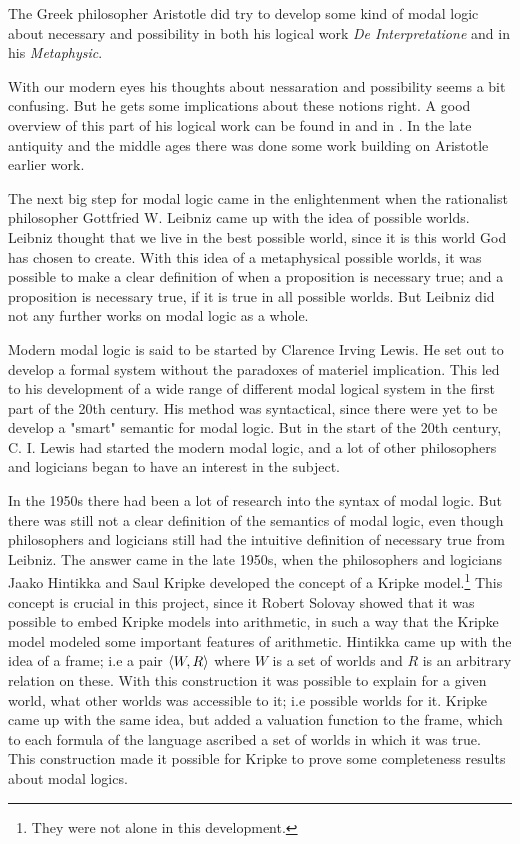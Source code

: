 \documentclass[../main.tex]{subfiles}
\begin{document}
The Greek philosopher Aristotle did try to develop some kind of modal logic
about necessary and possibility in both his logical work \textit{De
Interpretatione} and in his
 \textit{Metaphysic}.

With our modern eyes his thoughts about nessaration and possibility seems a
bit confusing. But he gets some implications about these notions right. A good
overview of this part of his logical work can be found in \parencite{Lemmon1977} and
in \parencite{Luka1957}.
In the late antiquity and the middle ages there was done some work building on 
Aristotle earlier work. 

The next big step for modal logic came in the enlightenment when the
rationalist philosopher Gottfried W. Leibniz came up with the idea of possible
worlds.  Leibniz thought that we live in the best possible world, since it is
this world God has chosen to create. With this idea of a metaphysical possible
worlds, it was possible to make a clear definition of when a proposition is
necessary true; and a proposition is necessary true, if it is true in all
possible worlds. But Leibniz did not any further works on modal logic as a
whole.

Modern modal logic is said to be started by Clarence Irving Lewis. He set out
to develop a formal system without the paradoxes of materiel
implication. This led to his development of a wide range of different modal
logical system in the first part of the 20th century. His method was
syntactical, since there were yet to be develop a "smart" semantic for modal
logic. But in the start of the 20th century, C. I. Lewis had started the modern
modal logic, and a lot of other philosophers and logicians began to have an
interest in the subject.


In the 1950s there had been a lot of research into the syntax of modal logic.
But there was still not a clear definition of the semantics of modal logic,
even though philosophers and logicians still had the intuitive definition of
necessary true from Leibniz. The answer came in the late 1950s, when the
philosophers and logicians Jaako Hintikka
and Saul Kripke developed the concept of a Kripke model.\footnote{They were not
	alone in this development.} This concept is crucial in this project,
since it Robert Solovay showed that it was possible to embed Kripke models into
arithmetic, in such a way that the Kripke model modeled some important features
of arithmetic.
Hintikka came up with the idea of a frame; i.e a pair $\langle W,R\rangle$ where $W$ is
a set of worlds and $R$ is an arbitrary relation on these. With this
construction it was possible to explain for a given world, what other worlds
was accessible to it; i.e possible worlds for it. Kripke came up with the same
idea, but added a valuation function to the frame, which to each formula of the
language ascribed a set of worlds in which it was true.  This construction made
it possible for Kripke to prove some completeness results about modal logics.
\end{document}
